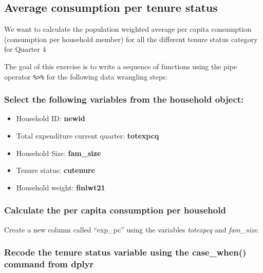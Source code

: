 \documentclass[
]{article}
\providecommand{\tightlist}{%
  \setlength{\itemsep}{0pt}\setlength{\parskip}{0pt}}
\begin{document}
\hypertarget{average-consumption-per-tenure-status}{%
\subsection{Average consumption per tenure
status}\label{average-consumption-per-tenure-status}}

We want to calculate the population weighted average per capita
consumption (consumption per household member) for all the different
tenure status category for Quarter 4

The goal of this exercise is to write a sequence of functions using the
pipe operator \texttt{\%\textgreater{}\%} for the following data
wrangling steps:

\hypertarget{select-the-following-variables-from-the-household-object}{%
\subsubsection{Select the following variables from the household
object:}\label{select-the-following-variables-from-the-household-object}}

\begin{itemize}
\tightlist
\item
  Household ID: \textbf{newid}
\item
  Total expenditure current quarter: \textbf{totexpcq}
\item
  Household Size: \textbf{fam\_size}
\item
  Tenure status: \textbf{cutenure}
\item
  Household weight: \textbf{finlwt21}
\end{itemize}

\hypertarget{calculate-the-per-capita-consumption-per-household}{%
\subsubsection{Calculate the per capita consumption per
household}\label{calculate-the-per-capita-consumption-per-household}}

Create a new column called ``exp\_pc'' using the variables
\emph{totexpcq} and \emph{fam\_size}.

\hypertarget{recode-the-tenure-status-variable-using-the-case_when-command-from-dplyr}{%
\subsubsection{Recode the tenure status variable using the case\_when()
command from
dplyr}\label{recode-the-tenure-status-variable-using-the-case_when-command-from-dplyr}}
\end{document}
